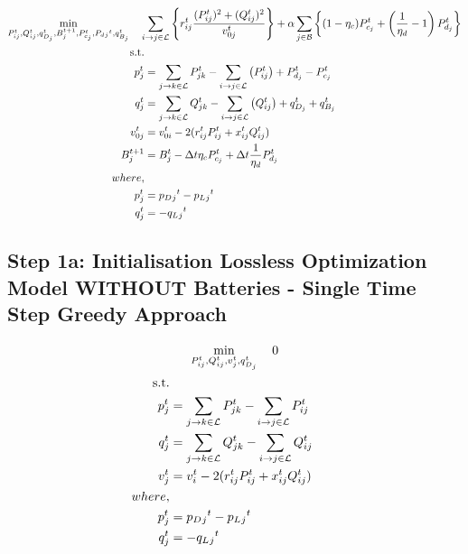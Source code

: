 \begin{gather}
    \min_{P_{ij}^t, Q_{ij}^t, q_{D_j}^t, B_{j}^{t+1},
	P_{c_j}^t, P_d{_j}^t, q_{B_j}^t} \quad
	\sum_{\fromto{i, j} \in \mathcal{L}} \left\{r_{ij}^t\frac{(P_{ij}^{t})^2 + (Q_{ij}^{t})^2}{v_{0j}^{t}} \right\} + 
	\alpha \sum_{j \in \mathcal{B}} \left\{(1- \eta_c)P_{c_j}^t + \left( \frac{1}{\eta_d}-1 \right) P_{d_j}^t \right\} \\
	\begin{align}
		\text{s.t.} & {}\nonumber \\
		{p_j^t} & = {\sum_{\fromto{j,k} \in \mathcal{L}} P_{jk}^t - \sum_{\fromto{i,j} \in \mathcal{L}}\left(P_{ij}^t\right) + P_{d_j}^t - P_{c_j}^t} && \\
		{q_j^t} & = {\sum_{\fromto{j,k} \in \mathcal{L}} Q_{jk}^t - \sum_{\fromto{i,j} \in \mathcal{L}}\left(Q_{ij}^t\right) + q_{D_j}^t + q_{B_j}^t} && \\
		{v_{0j}^t} & = {v_{0i}^t - 2(r_{ij}^tP_{ij}^t + x_{ij}^tQ_{ij}^t)} && \\
		{B_{j}^{t+1}} &= {B_{j}^{t} - \Delta t  \eta_c P_{c_j}^t + \Delta t\frac{1}{\eta_d} P_{d_j}^t} \\
		{where,} & {} \\
		{p_j^t} &= {p_D{_j}^t - p_L{_j}^t} \\
		{q_j^t} &= {-q_L{_j}^t}
	\end{align}
\end{gather}

\subsection*{Step 1a: Initialisation Lossless Optimization Model WITHOUT Batteries - Single Time Step Greedy Approach}


\begin{gather}
    \min_{P_{ij}^t, Q_{ij}^t, v_{j}^t,  q_{D_j}^t} \quad 0 \\
	\begin{align}
		\text{s.t.} & {}\nonumber \\
		{p_j^t} & = {\sum_{\fromto{j,k} \in \mathcal{L}} P_{jk}^t - \sum_{\fromto{i,j} \in \mathcal{L}} P_{ij}^t } && \\
		{q_j^t} & = {\sum_{\fromto{j,k} \in \mathcal{L}} Q_{jk}^t - \sum_{\fromto{i,j} \in \mathcal{L}} Q_{ij}^t } && \\
		{v_j^t} & = {v_{i}^t - 2(r_{ij}^tP_{ij}^t + x_{ij}^tQ_{ij}^t)} && \\
		{where,} & {} \\
		{p_j^t} &= {p_D{_j}^t - p_L{_j}^t} \\
		{q_j^t} &= {-q_L{_j}^t}
	\end{align}
\end{gather}


